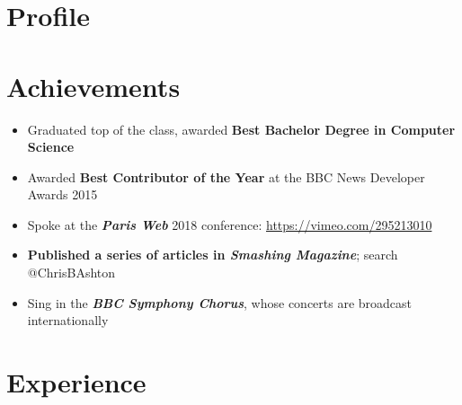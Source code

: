 \documentclass[letterpaper]{twentysecondcv} %
\begin{document}
\makeprofile %

\section{Profile}
\cvsummary

\section{Achievements}
\begin{itemize}[itemsep=-.5mm] %
    \item Graduated top of the class, awarded \textbf{Best Bachelor Degree in Computer Science}

    \item Awarded \textbf{Best Contributor of the Year} at the BBC News Developer Awards 2015

    \item Spoke at the \textbf{\emph{Paris Web}} 2018 conference: \url{https://vimeo.com/295213010}

    \item \textbf{Published a series of articles in \emph{Smashing Magazine}}; search @ChrisBAshton

    \item Sing in the \textbf{\emph{BBC Symphony Chorus}}, whose concerts are broadcast internationally
\end{itemize}


\section{Experience}
\end{document}
